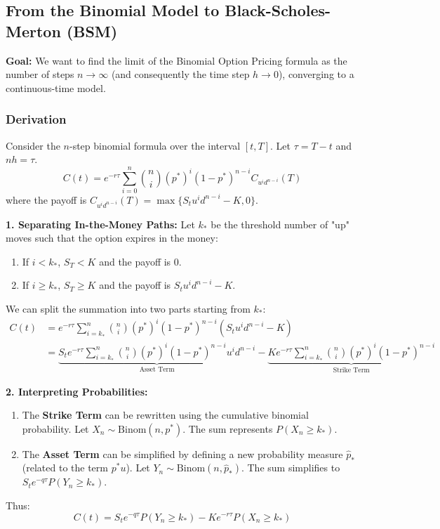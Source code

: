 \subsection{From the Binomial Model to Black-Scholes-Merton (BSM)}

\textbf{Goal:} We want to find the limit of the Binomial Option Pricing formula as the number of steps \(n \to \infty\) (and consequently the time step \(h \to 0\)), converging to a continuous-time model.

\subsubsection{Derivation}
Consider the \(n\)-step binomial formula over the interval \([t, T]\). Let \(\tau = T-t\) and \(n h = \tau\).
\begin{equation*}
    C(t) = e^{-r\tau} \sum_{i=0}^{n} \binom{n}{i} (p^*)^i (1-p^*)^{n-i} C_{u^i d^{n-i}}(T)
\end{equation*}
where the payoff is \(C_{u^i d^{n-i}}(T) = \max \{ S_t u^i d^{n-i} - K, 0 \}\).

\textbf{1. Separating In-the-Money Paths:}
Let \(k_*\) be the threshold number of "up" moves such that the option expires in the money:
\begin{enumerate}
    \item If \(i < k_*\), \(S_T < K\) and the payoff is 0.
    \item If \(i \ge k_*\), \(S_T \ge K\) and the payoff is \(S_t u^i d^{n-i} - K\).
\end{enumerate}
We can split the summation into two parts starting from \(k_*\):
\begin{align*}
    C(t) &= e^{-r\tau} \sum_{i=k_*}^{n} \binom{n}{i} (p^*)^i (1-p^*)^{n-i} (S_t u^i d^{n-i} - K) \\
    &= \underbrace{S_t e^{-r\tau} \sum_{i=k_*}^{n} \binom{n}{i} (p^*)^i (1-p^*)^{n-i} u^i d^{n-i}}_{\text{Asset Term}} - \underbrace{K e^{-r\tau} \sum_{i=k_*}^{n} \binom{n}{i} (p^*)^i (1-p^*)^{n-i}}_{\text{Strike Term}}
\end{align*}

\textbf{2. Interpreting Probabilities:}
\begin{enumerate}
    \item The \textbf{Strike Term} can be rewritten using the cumulative binomial probability. Let \(X_n \sim \text{Binom}(n, p^*)\). The sum represents \(P(X_n \ge k_*)\).
    \item The \textbf{Asset Term} can be simplified by defining a new probability measure \(\hat{p}_*\) (related to the term \(p^* u\)). Let \(Y_n \sim \text{Binom}(n, \hat{p}_*)\). The sum simplifies to \(S_t e^{-q\tau} P(Y_n \ge k_*)\).
\end{enumerate}
Thus:
\begin{equation*}
    C(t) = S_t e^{-q\tau} P(Y_n \ge k_*) - K e^{-r\tau} P(X_n \ge k_*)
\end{equation*}

